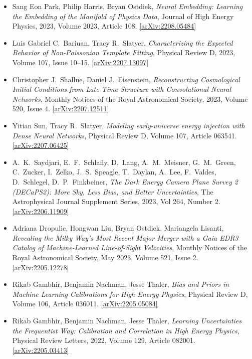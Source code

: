 \begin{itemize}
\item Sang Eon Park, Philip Harris, Bryan Ostdiek, \textit{Neural Embedding: Learning the Embedding of the Manifold of Physics Data}, Journal of High Energy Physics, 2023, Volume 2023, Article 108. \href{https://arxiv.org/abs/2208.05484}{[arXiv:2208.05484]} 
\item Luis Gabriel C.\  Bariuan, Tracy R.\  Slatyer, \textit{Characterizing the Expected Behavior of Non-Poissonian Template Fitting}, Physical Review D, 2023, Volume 107, Issue 10–15. \href{https://arxiv.org/abs/2207.13097}{[arXiv:2207.13097]} 
\item Christopher J.\  Shallue, Daniel J.\  Eisenstein, \textit{Reconstructing Cosmological Initial Conditions from Late-Time Structure with Convolutional Neural Networks}, Monthly Notices of the Royal Astronomical Society, 2023, Volume 520, Issue 4. \href{https://arxiv.org/abs/2207.12511}{[arXiv:2207.12511]} 
\item Yitian Sun, Tracy R.\  Slatyer, \textit{Modeling early-universe energy injection with Dense Neural Networks}, Physical Review D, Volume 107, Article 063541. \href{https://arxiv.org/abs/2207.06425}{[arXiv:2207.06425]} 
\item A.\  K.\  Saydjari, E.\  F.\  Schlafly, D.\  Lang, A.\  M.\  Meisner, G.\  M.\  Green, C.\  Zucker, I.\  Zelko, J.\  S.\  Speagle, T.\  Daylan, A.\  Lee, F.\  Valdes, D.\  Schlegel, D.\  P.\  Finkbeiner, \textit{The Dark Energy Camera Plane Survey 2 (DECaPS2): More Sky, Less Bias, and Better Uncertainties}, The Astrophysical Journal Supplement Series, 2023, Vol 264, Number 2. \href{https://arxiv.org/abs/2206.11909}{[arXiv:2206.11909]} 
\item Adriana Dropulic, Hongwan Liu, Bryan Ostdiek, Mariangela Lisanti, \textit{Revealing the Milky Way's Most Recent Major Merger with a Gaia EDR3 Catalog of Machine-Learned Line-of-Sight Velocities}, Monthly Notices of the Royal Astronomical Society, May 2023, Volume 521, Issue 2. \href{https://arxiv.org/abs/2205.12278}{[arXiv:2205.12278]} 
\item Rikab Gambhir, Benjamin Nachman, Jesse Thaler, \textit{Bias and Priors in Machine Learning Calibrations for High Energy Physics}, Physical Review D, Volume 106, Article 036011. \href{https://arxiv.org/abs/2205.05084}{[arXiv:2205.05084]} 
\item Rikab Gambhir, Benjamin Nachman, Jesse Thaler, \textit{Learning Uncertainties the Frequentist Way: Calibration and Correlation in High Energy Physics}, Physical Review Letters, 2022, Volume 129, Article 082001. \href{https://arxiv.org/abs/2205.03413}{[arXiv:2205.03413]} 

\end{itemize}
